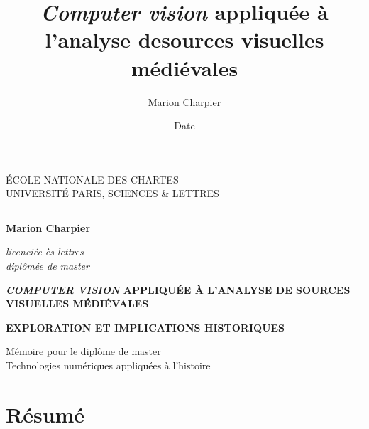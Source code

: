 \documentclass[12pt,twoside]{book}
\author{Marion Charpier}
\title{\textit{Computer vision} appliquée à l'analyse desources visuelles médiévales}
\date{Date}
\begin{document}
\begin{titlepage}

\begin{center}

    \bigskip

    \begin{large}
        ÉCOLE NATIONALE DES CHARTES\\
        UNIVERSITÉ PARIS, SCIENCES \& LETTRES
    \end{large}    


\begin{center}\rule{2cm}{0.02cm}\end{center}

\bigskip
\bigskip
\bigskip

\begin{Large}
    \textbf{Marion Charpier}
\end{Large}


\begin{normalsize}
 \textit{licenciée ès lettres}\\
 \textit{diplômée de master}
\end{normalsize}

\bigskip
\bigskip
\bigskip

\begin{Huge}
\textbf{\textit{COMPUTER VISION} APPLIQUÉE À L'ANALYSE DE SOURCES VISUELLES MÉDIÉVALES}\\
\end{Huge}
\bigskip
\bigskip
\begin{Large}
    \textbf{EXPLORATION ET IMPLICATIONS HISTORIQUES}
\end{Large}

\vfill

\begin{large}
    Mémoire pour le diplôme de master\\
   \og Technologies numériques appliquées à l'histoire\fg{}\\
\end{large}



\end{center}
\end{titlepage}


\frontmatter

\chapter{Résumé}
\end{document}
